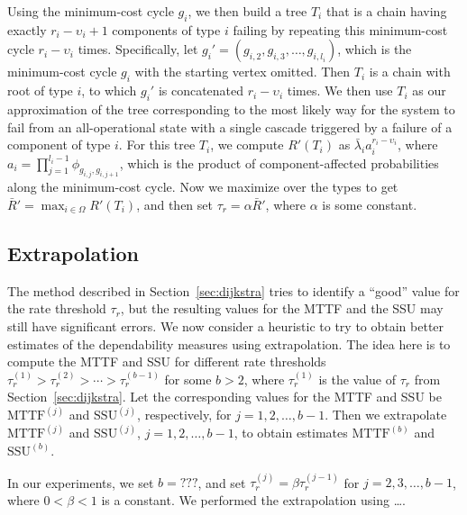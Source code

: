 \documentclass[12pt]{article}
\begin{document}
Using the minimum-cost cycle $g_i$,
we then build a tree $T_i$ that is
a chain having
exactly $r_i - \upsilon_i + 1$
components of type $i$ failing
by repeating this minimum-cost cycle
$r_i - \upsilon_i$ times.
Specifically, let $g_i' =
(g_{i,2}, g_{i,3}, \ldots, g_{i,l_i})$,
which is the minimum-cost cycle $g_i$
with the starting vertex omitted.
Then $T_i$ is a chain with root
of type $i$, to which $g_i'$
is concatenated
$r_i - \upsilon_i$ times.
We then use $T_i$ as
our approximation of
the tree corresponding to the
most likely way for the system
to fail from an all-operational state
with a single cascade triggered by a failure of
a component of type $i$.
For this tree $T_i$, we compute
$R'(T_i)$ as $\bar{\lambda}_i
a_i^{r_i - \upsilon_i}$,
where
$a_i = \prod_{j=1}^{l_i-1}
\phi_{g_{i,j}, g_{i,j+1}}$,
which is the product of
component-affected probabilities
along the minimum-cost
cycle.
Now we maximize over the types
to get
$\bar{R}' = \max_{i \in \Omega} R'(T_i)$,
and then set $\tau_r = \alpha \bar{R}'$,
where $\alpha$ is some constant.


\subsection{Extrapolation}

The method described in 
Section~\ref{sec:dijkstra}
tries to identify a ``good''
value for the rate threshold $\tau_r$,
but the resulting values for the MTTF
and the SSU may still have
significant errors.
We now consider a heuristic
to try to obtain better
estimates of the dependability
measures
using extrapolation.
The idea here is to compute
the MTTF and SSU for different
rate thresholds $\tau_r^{(1)} > 
\tau_r^{(2)} > \cdots >
\tau_r^{(b-1)}$
for some $b > 2$,
where $\tau_r^{(1)}$ is the
value of $\tau_r$ from
Section~\ref{sec:dijkstra}.
Let the corresponding values
for the MTTF and SSU be
$\mbox{MTTF}^{(j)}$
and $\mbox{SSU}^{(j)}$,
respectively,
for $j = 1, 2, \ldots, b-1$.
Then we extrapolate
$\mbox{MTTF}^{(j)}$
and $\mbox{SSU}^{(j)}$,
$j = 1, 2, \ldots, b-1$,
to obtain estimates
$\mbox{MTTF}^{(b)}$
and 
$\mbox{SSU}^{(b)}$.

In our experiments,
we set $b = ???$,
and set $\tau_r^{(j)} = 
\beta \tau_r^{(j-1)}$
for $j = 2, 3, \dots, b-1$,
where $0 < \beta < 1$ is a constant.
We performed the extrapolation
using \dots.
\end{document}

